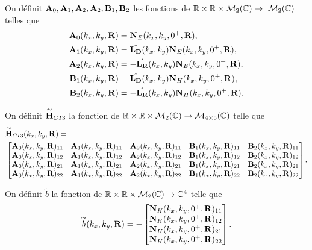     \begin{defn}
      On définit \(\mathbf{A}_0,\mathbf{A}_1,\mathbf{A}_2,\mathbf{A}_2,\mathbf{B}_1,\mathbf{B}_2\) les fonctions de \(\mathbb R \times \mathbb R \times \mathcal{M}_2(\mathbb C) \rightarrow \ \mathcal{M}_2(\mathbb C)\) telles que        
      \begin{align*}
        \mathbf{A}_0(k_x,k_y,\mathbf{R}) &= \mathbf{N}_E(k_x,k_y,0^+,\mathbf{R}),
        \\
        \mathbf{A}_1(k_x,k_y,\mathbf{R}) &= \hat{\mathbf{L_D}}(k_x,k_y)\mathbf{N}_E(k_x,k_y,0^+,\mathbf{R}),
        \\
        \mathbf{A}_2(k_x,k_y,\mathbf{R}) &= -\hat{\mathbf{L_R}}(k_x,k_y)\mathbf{N}_E(k_x,k_y,0^+,\mathbf{R}),
        \\
        \mathbf{B}_1(k_x,k_y,\mathbf{R}) &= \hat{\mathbf{L_D}}(k_x,k_y)\mathbf{N}_H(k_x,k_y,0^+,\mathbf{R}),
        \\
        \mathbf{B}_2(k_x,k_y,\mathbf{R}) &= -\hat{\mathbf{L_R}}(k_x,k_y)\mathbf{N}_H(k_x,k_y,0^+,\mathbf{R}).            
      \end{align*}

      On définit \(\overset{\thicksim}{\mathbf{H}}_{CI3}\) la fonction de \(\mathbb R \times \mathbb R \times \mathcal{M}_2(\mathbb C) \rightarrow \mathcal{M}_{4\times5}(\mathbb C)\) telle que
      \begin{align*}
        & \overset{\thicksim}{\mathbf{H}}_{CI3}(k_x,k_y,\mathbf{R}) =  \\ &
        \begin{bmatrix}
          \mathbf{A}_0(k_x,k_y,\mathbf{R})_{11} & \mathbf{A}_1(k_x,k_y,\mathbf{R})_{11} & \mathbf{A}_2(k_x,k_y,\mathbf{R})_{11} & \mathbf{B}_1(k_x,k_y,\mathbf{R})_{11} & \mathbf{B}_2(k_x,k_y,\mathbf{R})_{11}
          \\
          \mathbf{A}_0(k_x,k_y,\mathbf{R})_{12} & \mathbf{A}_1(k_x,k_y,\mathbf{R})_{12} & \mathbf{A}_2(k_x,k_y,\mathbf{R})_{12} & \mathbf{B}_1(k_x,k_y,\mathbf{R})_{12} & \mathbf{B}_2(k_x,k_y,\mathbf{R})_{12}
          \\
          \mathbf{A}_0(k_x,k_y,\mathbf{R})_{21} & \mathbf{A}_1(k_x,k_y,\mathbf{R})_{21} & \mathbf{A}_2(k_x,k_y,\mathbf{R})_{21} & \mathbf{B}_1(k_x,k_y,\mathbf{R})_{21} & \mathbf{B}_2(k_x,k_y,\mathbf{R})_{21}
          \\
          \mathbf{A}_0(k_x,k_y,\mathbf{R})_{22} & \mathbf{A}_1(k_x,k_y,\mathbf{R})_{22} & \mathbf{A}_2(k_x,k_y,\mathbf{R})_{22} & \mathbf{B}_1(k_x,k_y,\mathbf{R})_{22} & \mathbf{B}_2(k_x,k_y,\mathbf{R})_{22}
        \end{bmatrix}.
      \end{align*}

      On définit \(\tilde{b}\) la fonction de \(\mathbb R \times \mathbb R \times \mathcal{M}_2(\mathbb C) \rightarrow \mathbb C^4\) telle que
      \begin{equation*}
        \overset{\thicksim}{b}(k_x,k_y,\mathbf{R}) = -
        \begin{bmatrix}
          \mathbf{N}_H(k_x,k_y,0^+,\mathbf{R})_{11}
          \\
          \mathbf{N}_H(k_x,k_y,0^+,\mathbf{R})_{12}
          \\
          \mathbf{N}_H(k_x,k_y,0^+,\mathbf{R})_{21}
          \\
          \mathbf{N}_H(k_x,k_y,0^+,\mathbf{R})_{22}
        \end{bmatrix}.
      \end{equation*}
    \end{defn}

